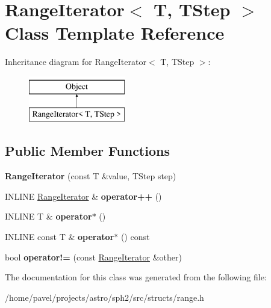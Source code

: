 \hypertarget{classRangeIterator}{}\section{Range\+Iterator$<$ T, T\+Step $>$ Class Template Reference}
\label{classRangeIterator}
Inheritance diagram for Range\+Iterator$<$ T, T\+Step $>$\+:\begin{figure}[H]
\begin{center}
\leavevmode
\includegraphics[height=2.000000cm]{classRangeIterator}
\end{center}
\end{figure}
\subsection*{Public Member Functions}
\begin{DoxyCompactItemize}
\item 
\hypertarget{classRangeIterator_acb4c90bda028eede14593ca975c2d6eb}{}\label{classRangeIterator_acb4c90bda028eede14593ca975c2d6eb} 
{\bfseries Range\+Iterator} (const T \&value, T\+Step step)
\item 
\hypertarget{classRangeIterator_ab9e4f0319b8f491422540c0ab7dddd5f}{}\label{classRangeIterator_ab9e4f0319b8f491422540c0ab7dddd5f} 
I\+N\+L\+I\+NE \hyperlink{classRangeIterator}{Range\+Iterator} \& {\bfseries operator++} ()
\item 
\hypertarget{classRangeIterator_a40ba1aab3c499855c66b76e05d3720d3}{}\label{classRangeIterator_a40ba1aab3c499855c66b76e05d3720d3} 
I\+N\+L\+I\+NE T \& {\bfseries operator$\ast$} ()
\item 
\hypertarget{classRangeIterator_ad87df1fab2105e31f776ec90ef94ab13}{}\label{classRangeIterator_ad87df1fab2105e31f776ec90ef94ab13} 
I\+N\+L\+I\+NE const T \& {\bfseries operator$\ast$} () const
\item 
\hypertarget{classRangeIterator_ad2f5d05eea4c0bfc27bd0b20b793f547}{}\label{classRangeIterator_ad2f5d05eea4c0bfc27bd0b20b793f547} 
bool {\bfseries operator!=} (const \hyperlink{classRangeIterator}{Range\+Iterator} \&other)
\end{DoxyCompactItemize}


The documentation for this class was generated from the following file\+:\begin{DoxyCompactItemize}
\item 
/home/pavel/projects/astro/sph2/src/structs/range.\+h\end{DoxyCompactItemize}
